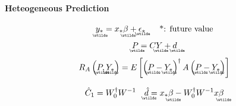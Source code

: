\documentclass{article}
\begin{document}
\bigskip

\paragraph{Heteogeneous Prediction}

\begin{equation*}
\underaccent{\wtilde}{y}%
_{\ast }=x_{\ast }%
\underaccent{\wtilde}{\beta}%
+%
\underaccent{\wtilde}{\epsilon}%
_{\ast }\quad \text{*: future value}
\end{equation*}%
\begin{equation*}
\underaccent{\wtilde}{P}%
=C%
\underaccent{\wtilde}{Y}%
+%
\underaccent{\wtilde}{d}%
\end{equation*}%
\begin{equation*}
R_{A}\left( 
\underaccent{\wtilde}{P}%
,%
\underaccent{\wtilde}{Y}%
_{\ast }\right) =E\left[ \left( 
\underaccent{\wtilde}{P}%
-%
\underaccent{\wtilde}{Y}%
_{\ast }\right) ^{\dagger }A\left( 
\underaccent{\wtilde}{P}%
-%
\underaccent{\wtilde}{Y}%
_{\ast }\right) \right]
\end{equation*}

\begin{equation*}
\hat{C}_{1}=W_{0}^{\dagger }W^{-1}\quad 
\underaccent{\wtilde}{\hat{d}}%
=x_{\ast }%
\underaccent{\wtilde}{\beta}%
-W_{0}^{\dagger }W^{-1}x%
\underaccent{\wtilde}{\beta}%
\end{equation*}
\end{document}
